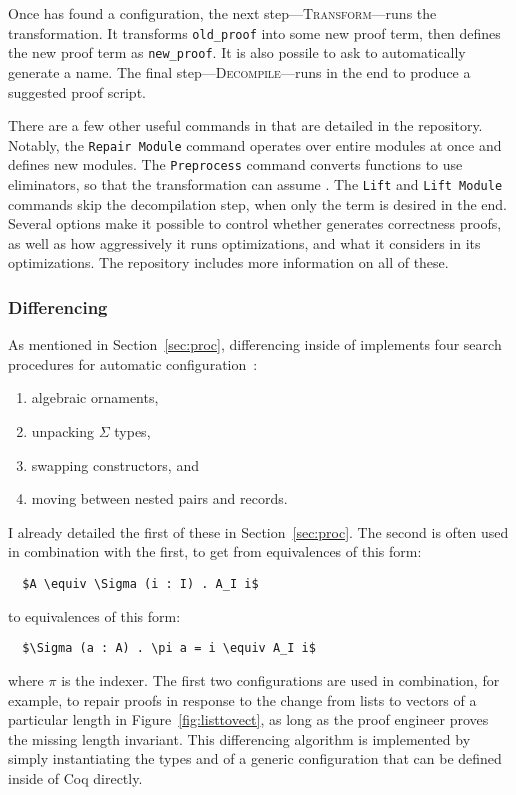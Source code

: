 Once \toolnamec has found a configuration, the next step---\textsc{Transform}---runs the transformation.
It transforms \lstinline{old_proof} into some new proof term, then defines the new proof term as \lstinline{new_proof}.
It is also possile to ask \toolnamec to automatically generate a name. %
The final step---\textsc{Decompile}---runs in the end to produce a suggested proof script.

There are a few other useful commands in \toolnamec that are detailed in the repository.
Notably, the \lstinline{Repair Module} command operates over entire modules at once and defines new modules.
The \lstinline{Preprocess} command converts functions to use eliminators, so that the transformation
can assume .
The \lstinline{Lift} and \lstinline{Lift Module} commands skip the decompilation step,
when only the term is desired in the end.
Several options make it possible to control whether \toolnamec generates correctness proofs,
as well as how aggressively it runs optimizations, and what it considers in its optimizations.
The repository includes more information on all of these.

\subsubsection{Differencing}
\label{sec:pi-details-diff}

As mentioned in Section~\ref{sec:proc}, differencing inside of
\toolnamec implements four search procedures for automatic configuration~\href{https://github.com/uwplse/pumpkin-pi/blob/v2.0.0/plugin/src/automation/lift/liftconfig.ml}{}:

\begin{enumerate}
\item algebraic ornaments,
\item unpacking $\Sigma$ types,
\item swapping constructors, and
\item moving between nested pairs and records.
\end{enumerate}
I already detailed the first of these in Section~\ref{sec:proc}.
The second is often used in combination with the first, to get from equivalences of this form:

\begin{lstlisting}
  $A \equiv \Sigma (i : I) . A_I i$
\end{lstlisting}
to equivalences of this form:

\begin{lstlisting}
  $\Sigma (a : A) . \pi a = i \equiv A_I i$
\end{lstlisting}
where $\pi$ is the indexer.
The first two configurations are used in combination, for example,
to repair proofs in response to the change from lists to vectors of a particular length in Figure~\ref{fig:listtovect},
as long as the proof engineer proves the missing length invariant.
This differencing algorithm is implemented by simply instantiating the types \Aa and \B of a generic 
configuration that can be defined inside of Coq directly.

